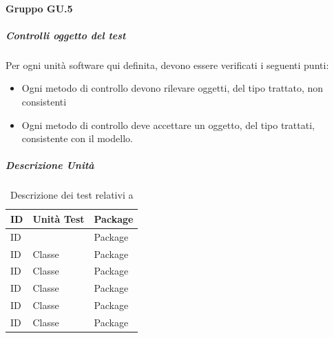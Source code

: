 \documentclass[12pt,a4paper]{article}
\begin{document}
\paragraph{Gruppo GU.5}
\subparagraph{Controlli oggetto del test}
Per ogni unità software qui definita, devono essere verificati i seguenti punti:
\begin{itemize}
	\item Ogni metodo di controllo devono rilevare oggetti, del tipo trattato, non consistenti
	\item Ogni metodo di controllo deve accettare un oggetto, del tipo trattati, consistente con il modello.
\end{itemize}
\subparagraph{Descrizione Unità}
\begin{table}[H]
	\begin{center}
		\begin{tabular}{p{} p{} p{}}
			\toprule
			\textbf{ID}   & \textbf{Unità Test}	& \textbf{Package} \\ \midrule
			\midrule
			ID &  & Package\\ \midrule
			ID & Classe & Package\\ \midrule
			ID & Classe & Package\\ \midrule
			ID & Classe & Package\\ \midrule
			ID & Classe & Package\\ \midrule
			ID & Classe & Package\\ \midrule
			
			\bottomrule
		\end{tabular}
	\end{center}
	\caption{Descrizione dei test relativi a \TODO{}}
\end{table}
\end{document}
